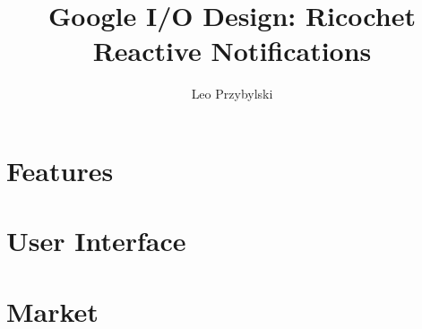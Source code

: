 \documentclass[12pt,notitlepage]{article}
\author{Leo Przybylski}
\title{Google I/O Design: Ricochet Reactive Notifications}
\begin{document}
\maketitle
\tableofcontents

\abstract{}

\section{Features}
\section{User Interface}
\section{Market}
\end{document}
